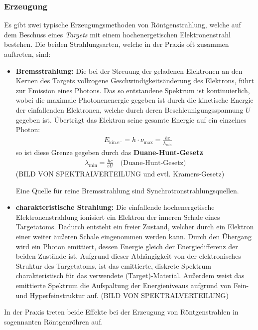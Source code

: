 \documentclass[10pt, a4paper]{article}
\begin{document}
\subsubsection{Erzeugung}
Es gibt zwei typische Erzeugungsmethoden von Röntgenstrahlung, welche auf dem Beschuss eines \emph{Targets} mit einem hochenergetischen Elektronenstrahl bestehen.
Die beiden Strahlungsarten, welche in der Praxis oft zusammen auftreten, sind:
\begin{itemize}
  \item \textbf{Bremsstrahlung:} Die bei der Streuung der geladenen Elektronen an den Kernen des Targets vollzogene Geschwindigkeitsänderung des Elektrons, führt zur Emission eines Photons.
  Das so entstandene Spektrum ist kontinuierlich, wobei die maximale Photonenenergie gegeben ist durch die kinetische Energie der einfallenden Elektronen, welche durch deren Beschleunigungsspannung $U$ gegeben ist.
  Überträgt das Elektron seine gesamte Energie auf ein einzelnes Photon:
  \begin{align}
    &E_\mathrm{kin. e^-} = h \cdot \nu_\mathrm{max} = \frac{hc}{\lambda_\mathrm{min}}
  \end{align}
  so ist diese Grenze gegeben durch das \textbf{Duane-Hunt-Gesetz}
  \begin{align}
    \lambda_\mathrm{min} = \frac{h c}{e U} \quad \text{(Duane-Hunt-Gesetz)}
  \end{align}
  (BILD VON SPEKTRALVERTEILUNG und evtl. Kramers-Gesetz)

  Eine Quelle für reine Bremsstrahlung sind Synchrotronstrahlungsquellen.

  \item \textbf{charakteristische Strahlung:} Die einfallende hochenergetische Elektronenstrahlung ionisiert ein Elektron der inneren Schale eines Targetatoms.
  Dadurch entsteht ein freier Zustand, welcher durch ein Elektron einer weiter äußeren Schale eingenommen werden kann.
  Durch den Übergang wird ein Photon emittiert, dessen Energie gleich der Energiedifferenz der beiden Zustände ist.
  Aufgrund dieser Abhängigkeit von der elektronisches Struktur des Targetatoms, ist das emittierte, diskrete Spektrum charakteristisch für das verwendete (Target)-Material.
  Außerdem weist das emittierte Spektrum die Aufspaltung der Energieniveaus aufgrund von Fein- und Hyperfeinstruktur auf.
  (BILD VON SPEKTRALVERTEILUNG)
\end{itemize}
In der Praxis treten beide Effekte bei der Erzeugung von Röntgenstrahlen in sogennanten Röntgenröhren auf.
\end{document}
